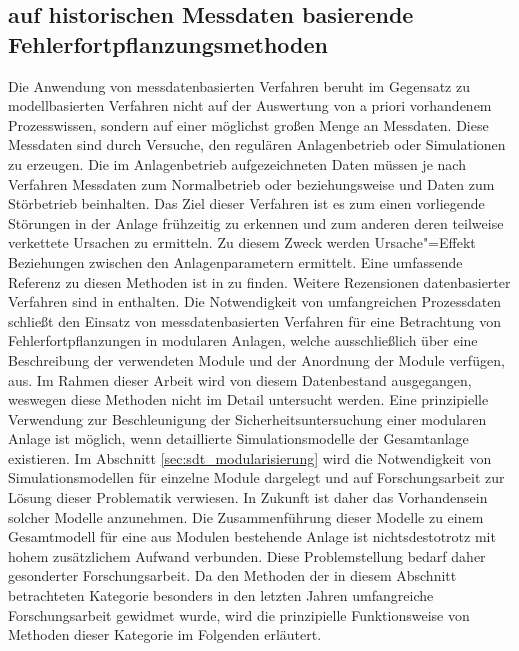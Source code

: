 \subsection{auf historischen Messdaten basierende Fehlerfortpflanzungsmethoden}\label{sec:fAna_dat}
Die Anwendung von messdatenbasierten Verfahren beruht im Gegensatz zu modellbasierten Verfahren nicht auf der Auswertung von a priori vorhandenem Prozesswissen, sondern auf einer m\"oglichst gro\ss{}en Menge an Messdaten. Diese Messdaten sind durch Versuche, den regul\"aren Anlagenbetrieb oder Simulationen zu erzeugen. Die im Anlagenbetrieb aufgezeichneten Daten m\"ussen je nach Verfahren Messdaten zum Normalbetrieb oder beziehungsweise und Daten zum St\"orbetrieb beinhalten. Das Ziel dieser Verfahren ist es zum einen vorliegende St\"orungen in der Anlage fr\"uhzeitig zu erkennen und zum anderen deren teilweise verkettete Ursachen zu ermitteln. Zu diesem Zweck werden Ursache"=Effekt Beziehungen zwischen den Anlagenparametern ermittelt. Eine umfassende Referenz zu diesen Methoden ist in  \cite{Paltrinieri_2016} zu finden. Weitere Rezensionen datenbasierter Verfahren sind in \cite{Venkatasubramanian_2003b, Thornhill_2006, Varga_2013, Yin_2014, Zhang_2017} enthalten.  \newline
Die Notwendigkeit von umfangreichen Prozessdaten schlie\ss{}t den Einsatz von messdatenbasierten Verfahren f\"ur eine Betrachtung von Fehlerfortpflanzungen in modularen Anlagen, welche ausschlie\ss{}lich \"uber eine Beschreibung der verwendeten Module und der Anordnung der Module verf\"ugen, aus. Im Rahmen dieser Arbeit wird von diesem Datenbestand  ausgegangen, weswegen diese Methoden nicht im Detail untersucht werden. \newline
Eine prinzipielle Verwendung zur Beschleunigung der Sicherheitsuntersuchung einer modularen Anlage ist m\"oglich, wenn detaillierte Simulationsmodelle der Gesamtanlage existieren. Im Abschnitt \ref{sec:sdt_modularisierung} wird die Notwendigkeit von Simulationsmodellen f\"ur einzelne Module dargelegt und auf Forschungsarbeit zur L\"osung dieser Problematik verwiesen. In Zukunft ist daher das Vorhandensein solcher Modelle anzunehmen. Die Zusammenf\"uhrung dieser Modelle zu einem Gesamtmodell f\"ur eine aus Modulen bestehende Anlage ist nichtsdestotrotz mit hohem zus\"atzlichem Aufwand verbunden. Diese Problemstellung bedarf daher gesonderter Forschungsarbeit. \newline
Da den Methoden der in diesem Abschnitt betrachteten Kategorie besonders in den letzten Jahren umfangreiche Forschungsarbeit gewidmet wurde, wird die prinzipielle Funktionsweise von Methoden dieser Kategorie im Folgenden erl\"autert. 

